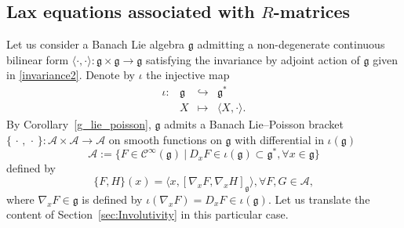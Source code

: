 \documentclass[a4paper,12pt,reqno]{amsart}%
\theoremstyle{definition}
\theoremstyle{remark}
\numberwithin{theorem}{section}
\numberwithin{equation}{section}
\newcommand{\1}{{\bf 1}}
\newcommand{\pb}{\{\,\cdot\,,\,\cdot\,\}}
\newcommand{\Cp}{\mathscr{C}}
\newcommand{\g}{{\mathfrak g}}
\begin{document}
\subsection{Lax equations associated with \texorpdfstring{$R$}{R}-matrices}

Let us consider a Banach Lie algebra $\g$ admitting a non-degenerate continuous bilinear form
$\langle\cdot, \cdot\rangle: \g \times \g\rightarrow \g$ satisfying the invariance by adjoint action of $\g$ given in  \eqref{invariance2}. Denote by $\iota$ the injective map
\begin{equation}\label{iota}
\begin{array}{llll}
\iota: & \g & \hookrightarrow & \g^*\\
& X & \mapsto & \langle X, \cdot\rangle.
\end{array}
\end{equation}
By Corollary~\ref{g_lie_poisson}, $\g$ admits a Banach Lie--Poisson bracket $\pb:\mathcal{A}\times\mathcal{A}\rightarrow \mathcal{A}$ on smooth functions on $\g$ with differential in $\iota(\g)$
 \begin{equation}\label{Adef}
 \mathcal{A} := \{F \in \Cp^{\infty}(\g)~|~D_xF\in\iota(\g)\subset\g^*, \forall x\in\g\}
 \end{equation}
defined by
\begin{equation}\label{pb}
\{ F, H \}(x) = \langle x, [\nabla_x F, \nabla_x H]_\g \rangle,  \forall F,G\in\mathcal{A},
\end{equation}
where $\nabla_xF\in\g$ is defined by $\iota(\nabla_x F) = D_xF\in\iota(\g)$.
Let us translate the content of Section~\ref{sec:Involutivity} in this particular case.
\end{document}
